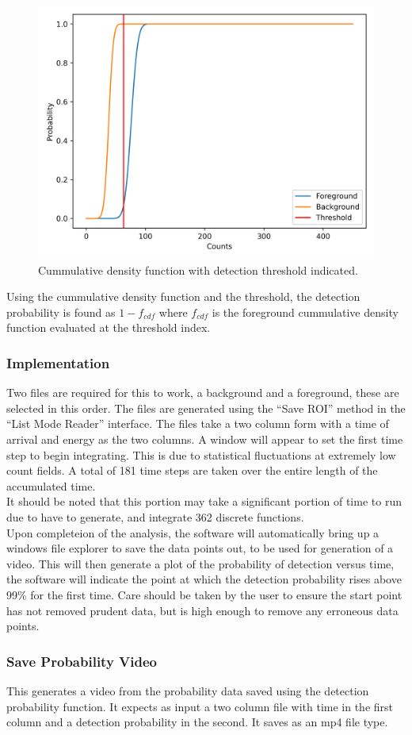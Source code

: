 	\begin{figure}[h!]
		\centering
		\includegraphics[width=\linewidth]{cdf.png}
		\caption{Cummulative density function with detection threshold indicated.}
		\label{fig:cdf}
	\end{figure}
Using the cummulative density function and the threshold, the detection probability is found as $1-f_{cdf}$ where $f_{cdf}$ is the foreground cummulative density function evaluated at the threshold index. 
\subsubsection{Implementation}
	Two files are required for this to work, a background and a foreground, these are selected in this order. The files are generated using the ``Save ROI'' method in the ``List Mode Reader'' interface. The files take a two column form with a time of arrival and energy as the two columns. A window will appear to set the first time step to begin integrating. This is due to statistical fluctuations at extremely low count fields. A total of 181 time steps are taken over the entire length of the accumulated time.\\ 
	
It should be noted that this portion may take a significant portion of time to run due to have to generate, and integrate 362 discrete functions. \\

Upon completeion of the analysis, the software will automatically bring up a windows file explorer to save the data points out, to be used for generation of a video. This will then generate a plot of the probability of detection versus time, the software will indicate the point at which the detection probability rises above 99\% for the first time. Care should be taken by the user to ensure the start point has not removed prudent data, but is high enough to remove any erroneous data points. 

\subsubsection{Save Probability Video}
	This generates a video from the probability data saved using the detection probability function. It expects as input a two column file with time in the first column and a detection probability in the second. It saves as an mp4 file type.



